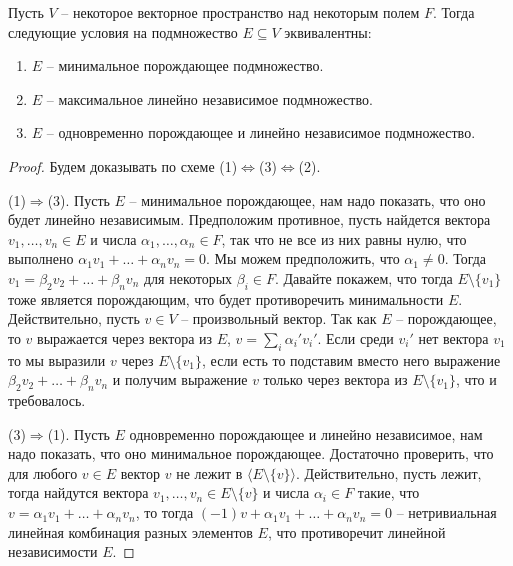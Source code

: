 \begin{claim}\label{claim::Basis}
Пусть $V$ -- некоторое векторное пространство над некоторым полем $F$. Тогда следующие условия на подмножество $E\subseteq V$ эквивалентны:
\begin{enumerate}
\item $E$ -- минимальное порождающее подмножество.
\item $E$ -- максимальное линейно независимое подмножество.
\item $E$ -- одновременно порождающее и линейно независимое подмножество.
\end{enumerate}
\end{claim}
\begin{proof}
Будем доказывать по схеме (1)$\Leftrightarrow$(3)$\Leftrightarrow$(2).

(1)$\Rightarrow$(3). Пусть $E$ -- минимальное порождающее, нам надо показать, что оно будет линейно независимым. Предположим противное, пусть найдется вектора $v_1,\ldots,v_n\in E$ и числа $\alpha_1,\ldots,\alpha_n\in F$, так что не все из них равны нулю, что выполнено $\alpha_1 v_1 +\ldots + \alpha_n v_n = 0$. Мы можем предположить, что $\alpha_1 \neq 0$. Тогда $v_1 = \beta_2 v_2 +\ldots + \beta_n v_n$ для некоторых $\beta_i\in F$. Давайте покажем, что тогда $E\setminus\{v_1\}$ тоже является порождающим, что будет противоречить минимальности $E$. Действительно, пусть $v\in V$ -- произвольный вектор. Так как $E$ -- порождающее, то $v$ выражается через вектора из $E$, $v = \sum_i \alpha_i' v_i'$. Если среди $v_i'$ нет вектора $v_1$ то мы выразили $v$ через $E\setminus\{v_1\}$, если есть то подставим вместо него выражение $\beta_2 v_2 + \ldots + \beta_n v_n$ и получим выражение $v$ только через вектора из $E\setminus \{v_1\}$, что и требовалось.

(3)$\Rightarrow$(1). Пусть $E$ одновременно порождающее и линейно независимое, нам надо показать, что оно минимальное порождающее. Достаточно проверить, что для любого $v\in E$ вектор $v$ не лежит в $\langle E\setminus\{v\}\rangle$. Действительно, пусть лежит, тогда найдутся вектора $v_1,\ldots, v_n\in E\setminus\{v\}$ и числа $\alpha_i\in F$ такие, что $v = \alpha_1 v_1 + \ldots + \alpha_n v_n$, то тогда $(-1)v + \alpha_1 v_1 + \ldots + \alpha_n v_n = 0$ -- нетривиальная линейная комбинация разных элементов $E$, что противоречит линейной независимости $E$.


\end{proof}
